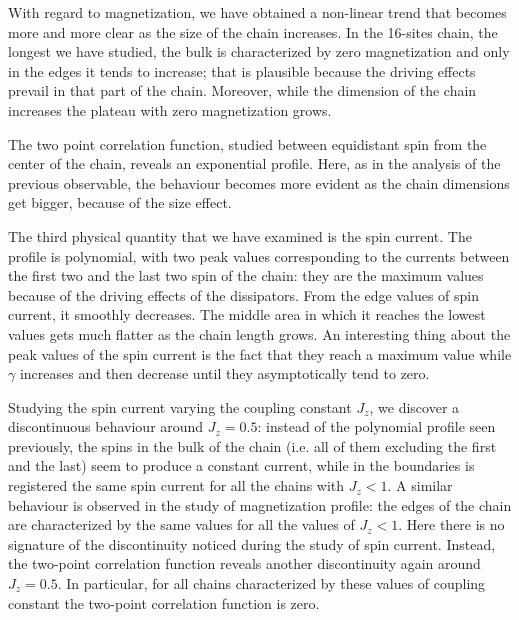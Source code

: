 \documentclass[12pt]{extarticle}
\begin{document}
With regard to magnetization, we have obtained a non-linear trend that becomes more and more clear as the size of the chain increases. In the 16-sites chain, the longest we have studied, the bulk is characterized by zero magnetization and only in the edges it tends to increase; that is plausible because the driving effects prevail in that part of the chain. Moreover, while the dimension of the chain increases the plateau with zero magnetization grows. 

The two point correlation function, studied between equidistant spin from the center of the chain, reveals an exponential profile. Here, as in the analysis of the previous observable, the behaviour becomes more evident as the chain dimensions get bigger, because of the size effect.

The third physical quantity that we have examined is the spin current. The profile is polynomial, with two peak values corresponding to the currents between the first two and the last two spin of the chain: they are the maximum values because of the driving effects of the dissipators. From the edge values of spin current, it smoothly decreases. The middle area in which it reaches the lowest values gets much flatter as the chain length grows. An interesting thing about the peak values of the spin current is the fact that they reach a maximum value while $\gamma$ increases and then decrease until they  asymptotically tend to zero.

Studying the spin current varying the coupling constant $J_z$, we discover a discontinuous behaviour around $J_z = 0.5$: instead of the polynomial profile seen previously, %
the spins in the bulk of the chain (i.e. all of them excluding the first and the last) seem to produce a constant current, while in the boundaries is registered the same spin current for all the chains with $J_z < 1$. A similar behaviour is observed in the study of magnetization profile: the edges of the chain are characterized by the same values for all the values of $J_z < 1$. Here there is no signature of the discontinuity noticed during the study of spin current. Instead, the two-point correlation function reveals another discontinuity again around $J_z = 0.5$. In particular, for all chains characterized by these values of coupling constant the two-point correlation function is zero.
\end{document}
